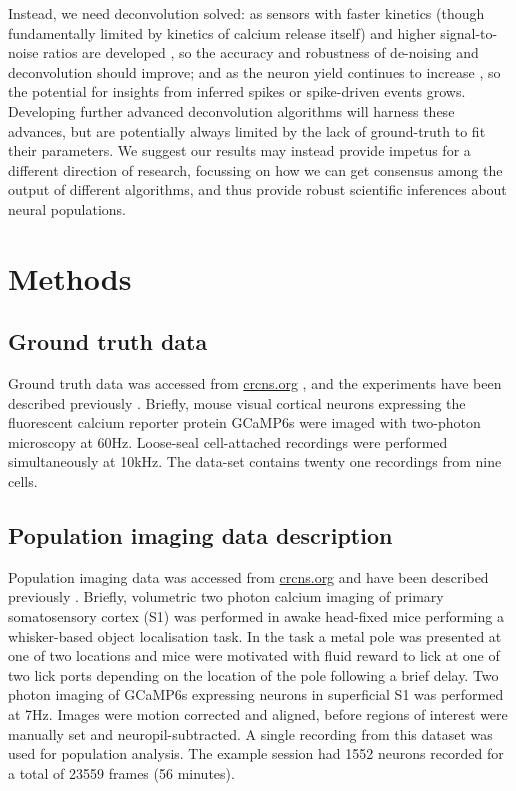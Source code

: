 \documentclass[a4paper,11pt]{article}
\begin{document}
Instead, we need deconvolution solved: as sensors with faster kinetics (though fundamentally limited by kinetics of calcium release itself) and higher signal-to-noise ratios are developed \citep{Badura2014-ub,Dana2016-yg,Dana2019-mz}, so the accuracy and robustness of de-noising and deconvolution should improve; and as the neuron yield continues to increase \citep{Stringer2019-ze,Ahrens2013-wm}, so the potential for insights from inferred spikes or spike-driven events grows. Developing further advanced deconvolution algorithms will harness these advances, but are potentially always limited by the lack of ground-truth to fit their parameters. We suggest our results may instead provide impetus for a different direction of research, focussing on how we can get consensus among the output of different algorithms, and thus provide robust scientific inferences about neural populations.

\clearpage
\section{Methods}
\subsection*{Ground truth data}
Ground truth data was accessed from \href{http://crcns.org/data-sets/methods/cai-1}{crcns.org} \citep{Svoboda2015-ym}, and the experiments have been described previously \citep{Chen2013-nv}. Briefly, mouse visual cortical neurons expressing the fluorescent calcium reporter protein GCaMP6s were imaged with two-photon microscopy at 60Hz. Loose-seal cell-attached recordings were performed simultaneously at 10kHz. The data-set contains twenty one recordings from nine cells.


\subsection*{Population imaging data description}
Population imaging data was accessed from \href{https://crcns.org/data-sets/ssc/ssc-2}{crcns.org} and have been described previously \citep{Peron2015-kd}. Briefly, volumetric two photon calcium imaging of primary somatosensory cortex (S1) was performed in awake head-fixed mice performing a whisker-based object localisation task. In the task a metal pole was presented at one of two locations and mice were motivated with fluid reward to lick at one of two lick ports depending on the location of the pole following a brief delay. Two photon imaging of GCaMP6s expressing neurons in superficial S1 was performed at 7Hz. Images were motion corrected and aligned, before regions of interest were manually set and neuropil-subtracted. A single recording from this dataset was used for population analysis. The example session had 1552 neurons recorded for a total of 23559 frames (56 minutes).
\end{document}
